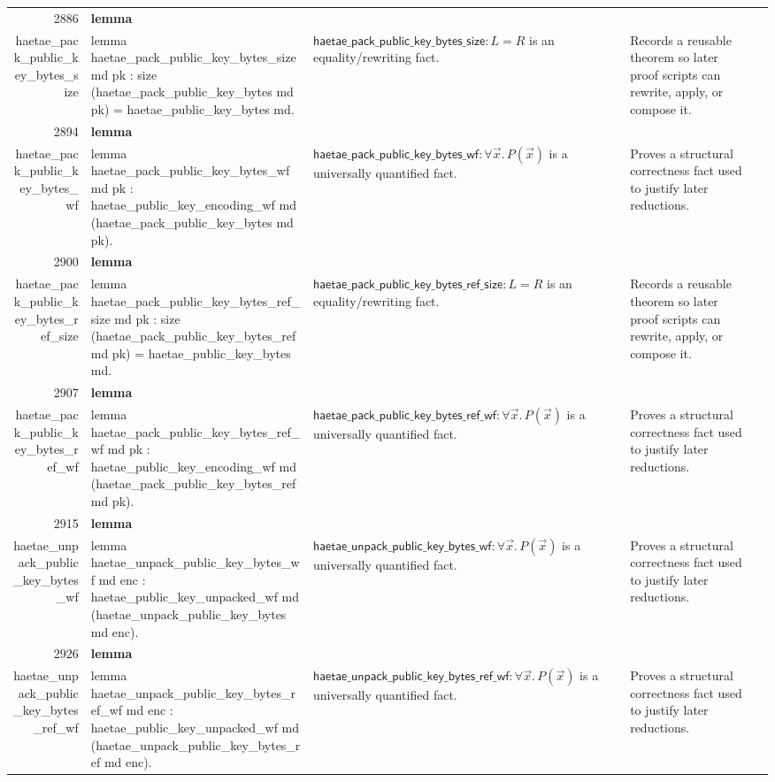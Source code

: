 \documentclass[10pt]{article}
\newcommand{\ec}[1]{\begingroup\ttfamily\scriptsize #1\endgroup}
\begin{document}
\begin{longtable}{r L{0.17\textwidth} L{0.26\textwidth} L{0.27\textwidth} L{0.20\textwidth}}
2886 & \textbf{lemma}\\\ec{haetae\_pack\_public\_key\_bytes\_size} & \ec{lemma haetae\_pack\_public\_key\_bytes\_size md pk : size (haetae\_pack\_public\_key\_bytes md pk) = haetae\_public\_key\_bytes md.} & \(\mathsf{haetae\_pack\_public\_key\_bytes\_size} : L = R\) is an equality/rewriting fact. & Records a reusable theorem so later proof scripts can rewrite, apply, or compose it. \\
2894 & \textbf{lemma}\\\ec{haetae\_pack\_public\_key\_bytes\_wf} & \ec{lemma haetae\_pack\_public\_key\_bytes\_wf md pk : haetae\_public\_key\_encoding\_wf md (haetae\_pack\_public\_key\_bytes md pk).} & \(\mathsf{haetae\_pack\_public\_key\_bytes\_wf} : \forall \vec{x}.\, P(\vec{x})\) is a universally quantified fact. & Proves a structural correctness fact used to justify later reductions. \\
2900 & \textbf{lemma}\\\ec{haetae\_pack\_public\_key\_bytes\_ref\_size} & \ec{lemma haetae\_pack\_public\_key\_bytes\_ref\_size md pk : size (haetae\_pack\_public\_key\_bytes\_ref md pk) = haetae\_public\_key\_bytes md.} & \(\mathsf{haetae\_pack\_public\_key\_bytes\_ref\_size} : L = R\) is an equality/rewriting fact. & Records a reusable theorem so later proof scripts can rewrite, apply, or compose it. \\
2907 & \textbf{lemma}\\\ec{haetae\_pack\_public\_key\_bytes\_ref\_wf} & \ec{lemma haetae\_pack\_public\_key\_bytes\_ref\_wf md pk : haetae\_public\_key\_encoding\_wf md (haetae\_pack\_public\_key\_bytes\_ref md pk).} & \(\mathsf{haetae\_pack\_public\_key\_bytes\_ref\_wf} : \forall \vec{x}.\, P(\vec{x})\) is a universally quantified fact. & Proves a structural correctness fact used to justify later reductions. \\
2915 & \textbf{lemma}\\\ec{haetae\_unpack\_public\_key\_bytes\_wf} & \ec{lemma haetae\_unpack\_public\_key\_bytes\_wf md enc : haetae\_public\_key\_unpacked\_wf md (haetae\_unpack\_public\_key\_bytes md enc).} & \(\mathsf{haetae\_unpack\_public\_key\_bytes\_wf} : \forall \vec{x}.\, P(\vec{x})\) is a universally quantified fact. & Proves a structural correctness fact used to justify later reductions. \\
2926 & \textbf{lemma}\\\ec{haetae\_unpack\_public\_key\_bytes\_ref\_wf} & \ec{lemma haetae\_unpack\_public\_key\_bytes\_ref\_wf md enc : haetae\_public\_key\_unpacked\_wf md (haetae\_unpack\_public\_key\_bytes\_ref md enc).} & \(\mathsf{haetae\_unpack\_public\_key\_bytes\_ref\_wf} : \forall \vec{x}.\, P(\vec{x})\) is a universally quantified fact. & Proves a structural correctness fact used to justify later reductions. \\

\end{longtable}
\end{document}
